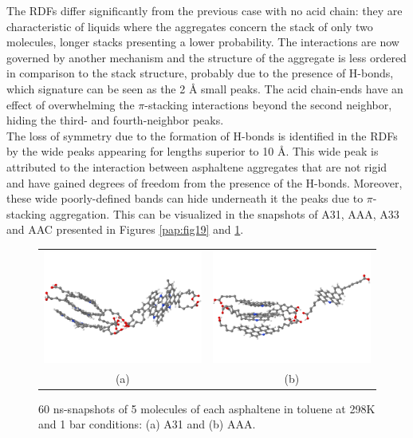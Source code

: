 The RDFs differ significantly from the previous case with no acid chain: they are characteristic of liquids where the aggregates concern the stack of only two molecules, longer stacks presenting a lower probability. The interactions are now governed by another mechanism and the structure of the aggregate is less ordered in comparison to the stack structure, probably due to the presence of H-bonds, which signature can be seen as the 2 \textup{\AA} small peaks. The acid chain-ends have an effect of overwhelming the $\pi$-stacking interactions beyond the second neighbor, hiding the third- and fourth-neighbor peaks.\\

The loss of symmetry due to the formation of H-bonds is identified in the RDFs by the wide peaks appearing for lengths superior to 10 \textup{\AA}. This wide peak is attributed to the interaction between asphaltene aggregates that are not rigid and have gained degrees of freedom from the presence of the H-bonds. Moreover, these wide poorly-defined bands can hide underneath it the peaks due to $\pi$-stacking aggregation. This can be visualized in the snapshots of A31, AAA, A33 and AAC presented in Figures \ref{pap:fig19} and \ref{pap:fig21}.

\begin{figure}[h]
	\begin{tabular}{cc}
		\includegraphics[width=0.5\columnwidth]{image/A31_60ns} & 	
		\includegraphics[width=0.5\columnwidth]{image/AAA_60ns} \\
		(a) & (b) \\
	\end{tabular}
	\caption{60 ns-snapshots of 5 molecules of each asphaltene in toluene at 298K and 1 bar conditions: (a) A31 and (b) AAA.}
	\label{pap:fig21}
\end{figure}

